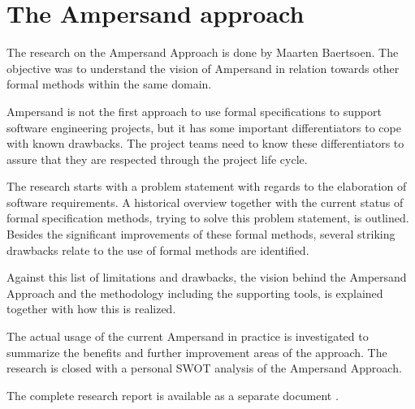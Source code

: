 

\section{The Ampersand approach}
\label{domain:approach}
The research on the Ampersand Approach is done by Maarten Baertsoen.
The objective was to understand the vision of Ampersand in relation towards other formal methods within the same domain.

Ampersand is not the first approach to use formal specifications to support software engineering projects, but it has some important differentiators to cope with known drawbacks.
The project teams need to know these differentiators to assure that they are respected through the project life cycle.

The research starts with a problem statement with regards to the elaboration of software requirements.
A historical overview together with the current status of formal specification methods, trying to solve this problem statement, is outlined.
Besides the significant improvements of these formal methods, several striking drawbacks relate to the use of formal methods are identified.

Against this list of limitations and drawbacks, the vision behind the Ampersand Approach and the methodology including the supporting tools, is explained together with how this is realized.

The actual usage of the current Ampersand in practice is investigated to summarize the benefits and further improvement areas of the approach.
The research is closed with a personal SWOT analysis of the Ampersand Approach.

The complete research report is available as a separate document .
